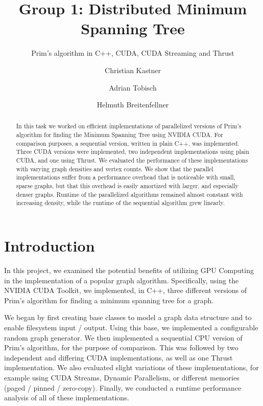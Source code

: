\documentclass[sigconf,nonacm]{acmart}
\begin{document}
\title{Group 1: Distributed Minimum Spanning Tree}
\subtitle{Prim's algorithm in C++, CUDA, CUDA Streaming and Thrust}
\author{Christian Kastner}
\author{Adrian Tobisch}
\author{Helmuth Breitenfellner}
\begin{abstract}
In this task we worked on efficient implementations of parallelized versions of Prim's
algorithm for finding the Minimum Spanning Tree using NVIDIA CUDA.
For comparison purposes, a sequential version, written in plain C++, was implemented.
Three CUDA versions were implemented, two independent implementations using plain CUDA,
and one using Thrust.
We evaluated the performance of these implementations with varying graph
densities and vertex counts. We show that the parallel implementations
suffer from a performance overhead that is noticeable with small,
sparse graphs, but that this overhead is easily amortized with larger,
and especially denser graphs. Runtime of the parallelized algorithms remained
almost constant with increasing density, while the runtime of the sequential
algorithm grew linearly.

\end{abstract}
\maketitle
\section{Introduction}

In this project, we examined the potential benefits of utilizing GPU Computing in the implementation of a popular graph algorithm. Specifically, using the NVIDIA CUDA Toolkit, we implemented, in C++, three different versions of Prim’s algorithm for finding a minimum spanning tree for a graph.

We began by first creating base classes to model a graph data structure and to enable filesystem input / output. Using this base, we implemented a configurable random graph generator. We then implemented a sequential CPU version of Prim’s algorithm, for the purpose of comparison. This was followed by two independent and differing CUDA implementations, as well as one Thrust implementation. We also evaluated slight variations of these implementations, for example using CUDA Streams, Dynamic Parallelism, or different memories (paged / pinned / zero-copy). Finally, we conducted a runtime performance analysis of all of these implementations.
\end{document}
